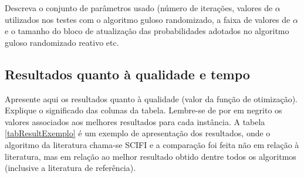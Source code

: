 \documentclass[12pt,fleqn]{article}
\begin{document}
Descreva o conjunto de parâmetros usado (número de iterações, valores de $\alpha$ utilizados nos testes com o algoritmo guloso randomizado, a faixa de valores de $\alpha$ e o tamanho do bloco de atualização das probabilidades adotados no algoritmo guloso randomizado reativo etc. 

\subsection{Resultados quanto à qualidade e tempo}
\label{subSecResultados}
Apresente aqui os resultados quanto à qualidade (valor da função de otimização). Explique o significado das colunas da tabela. Lembre-se de por em negrito os valores associados aos melhores resultados para cada instância. A tabela \ref{tabResultExemplo} é um exemplo de apresentação dos resultados, onde o algoritmo da literatura chama-se SCIFI e a comparação foi feita não em relação à literatura, mas em relação ao melhor resultado obtido dentre todos os algoritmos (inclusive a literatura de referência).
\end{document}
